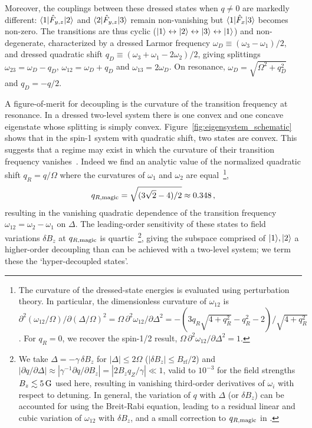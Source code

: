 \documentclass[aps,prl,reprint,superscriptaddress,floatfix]{revtex4-1}
\begin{document}
Moreover, the couplings between these dressed states when $q \neq 0$ are markedly different:
$\langle 1 \vert  \hat{F}_{y,z} \vert 2 \rangle $ and $\langle 2 \vert  \hat{F}_{y,z} \vert 3 \rangle $ remain non-vanishing but $\langle 1 \vert  \hat{F}_x \vert 3 \rangle $ becomes non-zero.
The transitions are thus cyclic ($\vert 1 \rangle  \leftrightarrow \vert 2 \rangle  \leftrightarrow \vert 3 \rangle  \leftrightarrow \vert 1 \rangle $) and non-degenerate, characterized by a dressed Larmor frequency $\omega_D\equiv(\omega_3-\omega_1)/2$, and dressed quadratic shift $q_D \equiv (\omega_3 + \omega_1 -2\omega_2)/2$, giving splittings $\omega_{23}=\omega_D-q_D$, $\omega_{12}=\omega_D+q_D$ and $\omega_{13}=2\omega_D$.
On resonance, $\omega_D=\sqrt{\Omega^2+q_D^2}$ and $q_D = -q/2$.

A figure-of-merit for decoupling is the curvature of the transition frequency at resonance.
In a dressed two-level system there is one convex and one concave eigenstate whose splitting is simply convex.
Figure~\ref{fig:eigensystem_schematic} shows that in the spin-1 system with quadratic shift, two states are convex.
This suggests that a regime may exist in which the curvature of their transition frequency vanishes~\cite{rabl_strong_2009,*xu_coherence-protected_2012}.
Indeed we find an analytic value of the normalized quadratic shift $q_R=q/\Omega$ where the curvatures of $\omega_1$ and $\omega_2$ are equal~\footnote{
  The curvature of the dressed-state energies is evaluated using perturbation theory. In particular, the dimensionless curvature of $\omega_{12}$ is $\partial^2(\omega_{12}/\Omega)/\partial(\Delta/\Omega)^2 = \Omega \, \partial^2\omega_{12}/\partial \Delta^2 = -(3 q_R \sqrt{4 + q_R^2} - q_R^2 - 2)/\sqrt{4 + q_R^2}$. For $q_R = 0$, we recover the spin-1/2 result, $\Omega\, \partial^2\omega_{12}/\partial \Delta^2 = 1$.},
\begin{align}
\label{eq:qRmagic}
    q_{R,\text{magic}} = \sqrt{(3\sqrt{2} - 4)/2} \approx 0.348 \, ,
\end{align}
resulting in the vanishing quadratic dependence of the transition frequency $\omega_{12}=\omega_2 - \omega_1$ on $\Delta$.
The leading-order sensitivity of these states to field variations $\delta B_z$ at $q_{R,\text{magic}}$ is quartic~\footnote{
    We take $\Delta = -\gamma \, \delta B_z$ for $|\Delta | \leq 2\Omega$ ($| \delta B_z | \leq B_{\text{rf}}/2$) and $| \partial q / \partial \Delta | \approx | \gamma^{-1} \partial q / \partial B_z | = |2 B_z q_Z / \gamma| \ll 1$, valid to $10^{-3}$ for the field strengths $B_z \lesssim \unit[5]{G}$ used here, resulting in vanishing third-order derivatives of $\omega_i$ with respect to detuning. 
    In general, the variation of $q$ with $\Delta$ (or $\delta B_z$) can be accounted for using the Breit-Rabi equation, leading to a residual linear and cubic variation of $\omega_{12}$ with $\delta B_z$, and a small correction to $q_{R,\text{magic}}$ in .},
giving the subspace comprised of ${\vert 1 \rangle ,\vert 2 \rangle }$ a higher-order decoupling than can be achieved with a two-level system; we term these the `hyper-decoupled states'.
\end{document}
